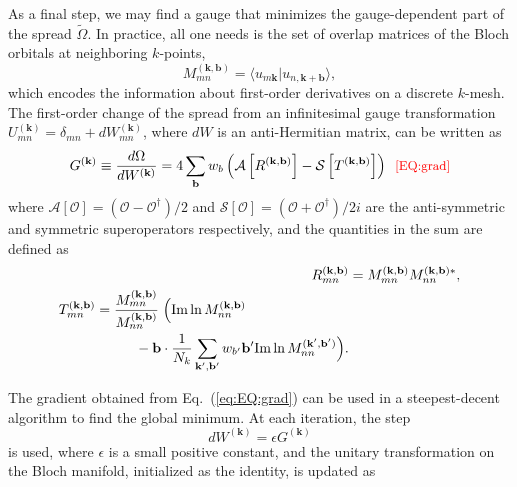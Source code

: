 \documentclass[galley,aps,pra,10pt,amsmath,amssymb,
    superscriptaddress,nofootinbib,longbibliography]{revtex4-2}
\def\Red#1{\textcolor{red}{#1}}
\newcounter{comm}
\def\commnext{\stepcounter{comm}}
\def\commtext{{\bf\color{blue}[\arabic{comm}]}}
\def\commmar{{\bf\color{blue}[\arabic{comm}]}}
\def\tcm#1{\commnext\marginpar{\small TC\commmar: #1}\commtext}
\newcommand{\eqlab}[1]{\Red{\hbox{\small\;\;[#1]}}\label{eq:#1}}
\def\tcm#1{}
\newcommand{\eqlab}[1]{\label{eq:#1}}
\newcommand{\eq}[1]{Eq.~(\ref{eq:#1})}
\begin{document}
As a final step, we may find a gauge that minimizes the gauge-dependent part of the spread $\widetilde{\Omega}$. In practice, all one needs is the set of overlap matrices of the Bloch orbitals at neighboring $k$-points,
\begin{equation}
    M_{mn}^{ (\mathbf{k}, \mathbf{b}) } = \langle u_{m \mathbf{k}} | u_{n, \mathbf{k}+\mathbf{b}} \rangle ,
\end{equation}
which encodes the information about first-order derivatives on a discrete $k$-mesh. The first-order change of the spread from an infinitesimal gauge transformation $U_{mn}^{(\mathbf{k})} = \delta_{mn} + dW_{mn}^{(\mathbf{k})}$, where $dW$ is an anti-Hermitian matrix, can be written as \cite{marzari1997, marzari2012}
\begin{equation}
    G^{(\mathbf{k})} \equiv \frac{d\Omega}{dW^{(\mathbf{k})}} = 4 \sum_{\mathbf{b}} w_b \left( \mathcal{A}\left[ R^{(\mathbf{k},\mathbf{b})} \right ] - \mathcal{S}\left[ T^{(\mathbf{k},\mathbf{b})}\right] \right)
    \eqlab{EQ:grad}
\end{equation}
where $\mathcal{A}\left[ \mathcal{O} \right ] = (\mathcal{O} - \mathcal{O}^{\dagger})/2$ and $\mathcal{S}\left[ \mathcal{O} \right ] = (\mathcal{O} + \mathcal{O}^{\dagger})/2i$ are the anti-symmetric and symmetric superoperators respectively, and the quantities in the sum are defined as
\begin{align}
    R^{(\mathbf{k},\mathbf{b})}_{mn} &= M^{(\mathbf{k},\mathbf{b})}_{mn}M^{(\mathbf{k},\mathbf{b}) *}_{nn} , \\
    \begin{split}
    T^{(\mathbf{k},\mathbf{b})}_{mn} &= \frac{M^{(\mathbf{k},\mathbf{b})}_{mn}}{M^{(\mathbf{k},\mathbf{b})}_{nn}} 
    \;\Big( \text{Im} \ln M^{(\mathbf{k},\mathbf{b})}_{nn} \\ & \hspace{1.0cm} - \mathbf{b} \cdot \frac{1}{N_k} \sum_{\mathbf{k}^{\prime}, \mathbf{b}^{\prime}} w_{b^{\prime}} \mathbf{b}^{\prime} \text{Im} \ln M^{(\mathbf{k}^{\prime},\mathbf{b}^{\prime} )}_{nn} \Big) .
    \end{split}
\end{align}
\tcm{Fixed $w_b$ to have prime}
The gradient obtained from \eq{EQ:grad} can be used in a steepest-decent algorithm to find the global minimum. At each iteration, the step
\begin{equation}
    dW^{(\mathbf{k})} = \epsilon G^{(\mathbf{k})}
\end{equation}
is used, where $\epsilon$ is a small positive constant, and the unitary transformation on the Bloch manifold, initialized as the identity, is updated as
\end{document}
